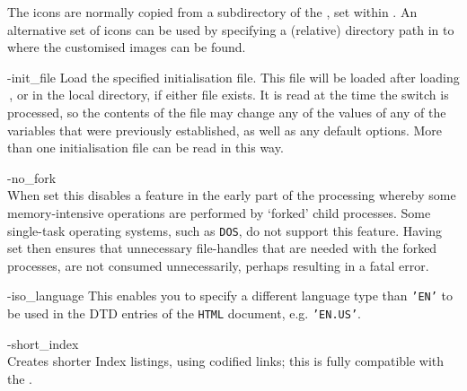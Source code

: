 \begin{htmllist}
%
\begin{changebar}
The icons are normally copied from a subdirectory of the ,
set within . An alternative set of icons can be used
by specifying a (relative) directory path in 
to where the customised images can be found.
\end{changebar}


%
%

\item [ -init\_file \Meta{file}\label{cs_initfile}]
Load the specified initialisation file. This \Perl{} file will be loaded after loading
\,, or  in the local
directory, if either file exists. It is read at the time the switch is processed,
so the contents of the file may change any of the values of any of the
variables that were previously established, as well as any default options.
More than one initialisation file can be read in this way.%

%

\begin{changebar}
%
\item [ -no\_fork\label{cs_no_fork}]
\\
When set this disables a feature in the early part of the processing
whereby some memory-intensive operations are performed by `forked'
child processes. Some single-task operating systems, such as \texttt{DOS},
do not support this feature. Having  set then ensures
that unnecessary file-handles that are needed with the forked processes,
are not consumed unnecessarily, perhaps resulting in a fatal \Perl{} error.

\item [ -iso\_language \Meta{type}\label{cs_iso_language}]
This enables you to specify a different language type than
\texttt{'EN'} to be used in the DTD entries of the \texttt{HTML}
document, e.g. \texttt{'EN.US'}.
\end{changebar}%

\begin{changebar}\noindent
\item [ -short\_index\label{cs_shortindex}]
\\
Creates shorter Index listings, using codified links;
this is fully compatible with the  .
\end{changebar}


\end{htmllist}
